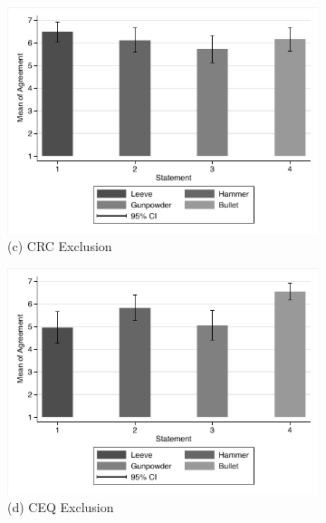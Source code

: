 \documentclass[egregdoesnotlikesansseriftitles,12pt]{scrartcl}
\begin{document}
\begin{landscape}
\begin{figure}[h!]
\begin{subfigure}[t]{0.28\textwidth}
      \includegraphics[scale=0.7]{figures/rev_crc_bar.pdf}
      \caption{\textsf{\scriptsize(c) CRC Exclusion}}
      \label{fig:rev_crc_bar}
   \end{subfigure}
   \begin{subfigure}[t]{0.28\textwidth}
      \includegraphics[scale=0.7]{figures/rev_ceq_bar.pdf}
      \caption{\textsf{\scriptsize(d) CEQ Exclusion}}
      \label{fig:rev_ceq_bar}
   \end{subfigure}
   \begin{subfigure}[t]{0.28\textwidth}

\end{subfigure}
\end{figure}
\end{landscape}
\end{document}
